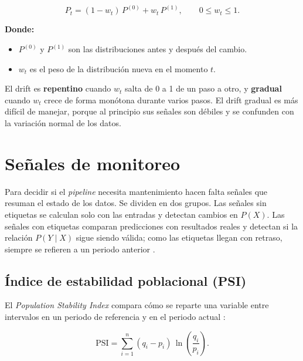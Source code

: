 \begin{equation}
    P_t = (1 - w_t)\,P^{(0)} + w_t\,P^{(1)}, \qquad 0 \leq w_t \leq 1.
    \label{eq:drift_shape}
\end{equation}

\noindent\textbf{Donde:}
\begin{itemize}
    \item $P^{(0)}$ y $P^{(1)}$ son las distribuciones antes y después del cambio.
    \item $w_t$ es el peso de la distribución nueva en el momento $t$.
\end{itemize}

El drift es \textbf{repentino} cuando $w_t$ salta de 0 a 1 de un paso a otro, y
\textbf{gradual} cuando $w_t$ crece de forma monótona durante varios pasos. El drift
gradual es más difícil de manejar, porque al principio sus señales son débiles y se
confunden con la variación normal de los datos.

\section{Señales de monitoreo}

Para decidir si el \textit{pipeline} necesita mantenimiento hacen falta señales que
resuman el estado de los datos. Se dividen en dos grupos. Las señales sin etiquetas se
calculan solo con las entradas y detectan cambios en $P(X)$. Las señales con etiquetas
comparan predicciones con resultados reales y detectan si la relación $P(Y \mid X)$ sigue
siendo válida; como las etiquetas llegan con retraso, siempre se refieren a un periodo
anterior \cite{gama2014survey,singh2025shift}.

\subsection{Índice de estabilidad poblacional (PSI)}

El \textit{Population Stability Index} compara cómo se reparte una variable entre
intervalos en un periodo de referencia y en el periodo actual \cite{shakhovska2025severity}:

\begin{equation}
    \text{PSI} = \sum_{i=1}^{n} (q_i - p_i)\,\ln\!\left(\frac{q_i}{p_i}\right).
    \label{eq:psi}
\end{equation}

